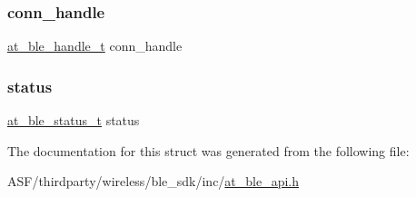 \mbox{\label{structat__ble__read__authorize__request__t_ae42df6fd8493f8f8faeccfdd6062e96f}} 
\subsubsection{\texorpdfstring{conn\_handle}{conn\_handle}}
{\footnotesize\ttfamily \mbox{\hyperlink{at__ble__api_8h_abd23646d0c662860741f787efc8456f2}{at\+\_\+ble\+\_\+handle\+\_\+t}} conn\+\_\+handle}

\mbox{\label{structat__ble__read__authorize__request__t_a0b48093fc2030779fc47e5216f8019e2}} 
\subsubsection{\texorpdfstring{status}{status}}
{\footnotesize\ttfamily \mbox{\hyperlink{group__error__codes__group_ga3b1db9b95feb157b3c188ca27fe76988}{at\+\_\+ble\+\_\+status\+\_\+t}} status}



The documentation for this struct was generated from the following file\+:\begin{DoxyCompactItemize}
\item 
A\+S\+F/thirdparty/wireless/ble\+\_\+sdk/inc/\mbox{\hyperlink{at__ble__api_8h}{at\+\_\+ble\+\_\+api.\+h}}\end{DoxyCompactItemize}
